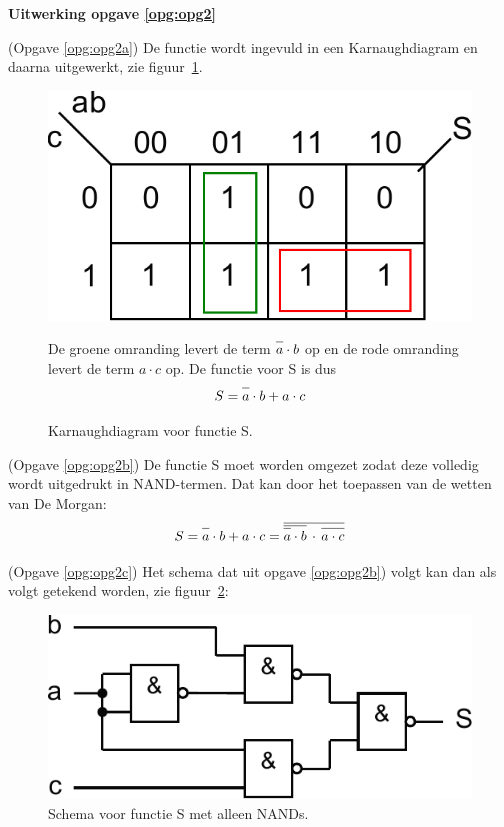 \documentclass[a4paper,12pt,addpoints,fleqn,dutch]{tisdexam}
\newcommand*{\oline}[1]{\overline{#1\mathstrut}}
\begin{document}
\begin{questions}
\newpage
\textbf{Uitwerking opgave \ref{opg:opg2}}

(Opgave \ref{opg:opg2a}) De functie wordt ingevuld in een Karnaughdiagram en daarna
uitgewerkt, zie figuur~\ref{fig:ant_opgave2a_kmaps}.

\begin{figure}[H]
  \begin{minipage}[c]{0.50\linewidth}
    \centering
	\includegraphics[scale=0.50]{pINLDIG2014_opgave2a_kmaps.pdf}
    \caption{Karnaughdiagram voor functie S.}
    \label{fig:ant_opgave2a_kmaps}
  \end{minipage}
  \begin{minipage}[c]{.40\linewidth}
  De groene omranding levert de term $\oline{a} \cdot b$ op en de rode
  omranding levert de term $a \cdot c$ op. De functie voor S is dus
  \begin{equation*}
  S = \oline{a} \cdot b + a \cdot c
  \end{equation*}
  \end{minipage}\hfill
\end{figure}

(Opgave \ref{opg:opg2b}) De functie S moet worden omgezet zodat deze volledig
wordt uitgedrukt in NAND-termen. Dat kan door het toepassen van de wetten van
De Morgan:
\begin{equation*}
S = \oline{a} \cdot b + a \cdot c = \oline{\oline{\oline{a} \cdot b} \, \cdot \, \oline{a \cdot c}}
\end{equation*}

(Opgave \ref{opg:opg2c}) Het schema dat uit opgave \ref{opg:opg2b}) volgt kan
dan als volgt getekend worden, zie figuur~\ref{fig:ant_opgave2c_schema}:

\begin{figure}[H]
  \centering
  \includegraphics[scale=0.63]{pINLDIG2014_opgave2c_schema.pdf}
  \caption{Schema voor functie S met alleen NANDs.}
  \label{fig:ant_opgave2c_schema}
\end{figure}



\end{questions}
\end{document}
